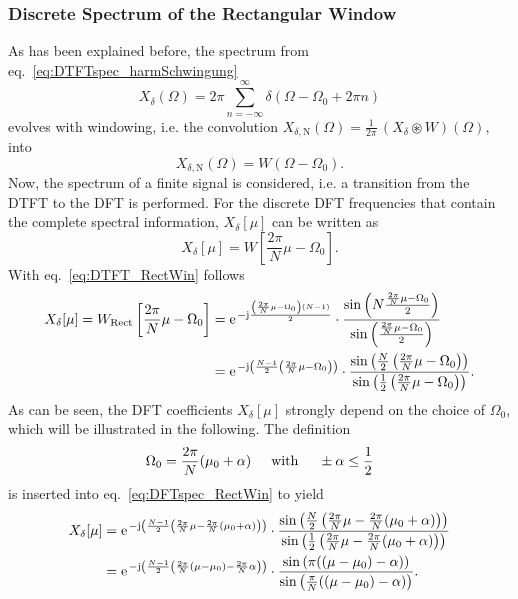 \documentclass[11pt,a4paper,DIV=12]{scrartcl}
\begin{document}
\subsubsection{Discrete Spectrum of the Rectangular Window}
As has been explained before, the spectrum from eq.~\eqref{eq:DTFTspec_harmSchwingung}
%
\begin{equation}
X_\delta(\Omega)=2\pi\sum\limits_{n=-\infty}^\infty\delta(\Omega-\Omega_0+2\pi n)
\end{equation}
%
evolves with windowing, i.e. the convolution
$X_{\delta,\text{N}}(\Omega)=\frac{1}{2\pi}\,(X_\delta\circledast W)(\Omega)$,
into
%
\begin{equation}
X_{\delta,\text{N}}(\Omega)=W(\Omega-\Omega_0).
\end{equation}
%
Now, the spectrum of a finite signal is considered, i.e. a transition from the
DTFT to the DFT is performed.
%
For the discrete DFT frequencies that contain the complete spectral information,
$X_\delta[\mu]$ can be written as
%
\begin{equation}
X_\delta[\mu]=W\left[\frac{2\pi}{N}\mu-\Omega_0\right].
\end{equation}
%
With eq.~\eqref{eq:DTFT_RectWin} follows
%
\begin{align}
X_\delta[\mu]=W_\text{Rect}\left[\frac{2\pi}{N}\mu-\Omega_0\right]&=\e^{-\im\frac{\left(\frac{2\pi}{N}\mu-\Omega_0\right)(N-1)}{2}}\cdot\frac{\sin\left(N\frac{\frac{2\pi}{N}\mu-\Omega_0}{2}\right)}{\sin\left(\frac{\frac{2\pi}{N}\mu-\Omega_0}{2}\right)}\\
&=\e^{-\im\left(\frac{N-1}{2}\left(\frac{2\pi}{N}\mu-\Omega_0\right)\right)}\cdot\frac{\sin\left(\frac{N}{2}\left(\frac{2\pi}{N}\mu-\Omega_0\right)\right)}{\sin\left(\frac{1}{2}\left(\frac{2\pi}{N}\mu-\Omega_0\right)\right)}.
\label{eq:DFTspec_RectWin}
\end{align}
%
As can be seen, the DFT coefficients $X_\delta[\mu]$ strongly depend on
the choice of $\Omega_0$, which will be illustrated in the following.
%
The definition
%
\begin{equation}
\Omega_0=\frac{2\pi}{N}(\mu_0+\alpha)
\hspace{5mm} \text{with} \hspace{5mm}
\pm\alpha\leq\frac{1}{2}
\end{equation}
%
is inserted into eq.~\eqref{eq:DFTspec_RectWin} to yield
%
\begin{align}
X_\delta[\mu]&=\e^{-\im\left(\frac{N-1}{2}\left(\frac{2\pi}{N}\mu-\frac{2\pi}{N}(\mu_0+\alpha)\right)\right)}\cdot\frac{\sin\left(\frac{N}{2}\left(\frac{2\pi}{N}\mu-\frac{2\pi}{N}(\mu_0+\alpha)\right)\right)}{\sin\left(\frac{1}{2}\left(\frac{2\pi}{N}\mu-\frac{2\pi}{N}(\mu_0+\alpha)\right)\right)}\\
&=\e^{-\im\left(\frac{N-1}{2}\left(\frac{2\pi}{N}(\mu-\mu_0)-\frac{2\pi}{N}\alpha\right)\right)}\cdot\frac{\sin\left(\pi((\mu-\mu_0)-\alpha)\right)}{\sin\left(\frac{\pi}{N}((\mu-\mu_0)-\alpha)\right)}.
\label{eq:DFTspec_mitalpha}
\end{align}
\end{document}
